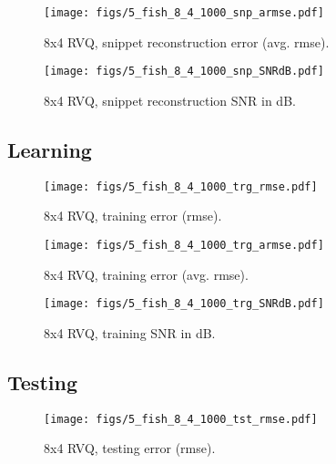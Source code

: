 								\begin{figure}[h!]
								\centering
								\texttt{[image: figs/5\_fish\_8\_4\_1000\_snp\_armse.pdf]}
								\caption{8x4 RVQ, snippet reconstruction error (avg. rmse).}
								\label{fig:5_fish_8_4_1000_snp_armse}
								\end{figure}

								\begin{figure}[h!]
								\centering
								\texttt{[image: figs/5\_fish\_8\_4\_1000\_snp\_SNRdB.pdf]}
								\caption{8x4 RVQ, snippet reconstruction SNR in dB.}
								\label{fig:5_fish_8_4_1000_snp_SNRdB}
								\end{figure}
\clearpage
\newpage
\subsection{Learning}

								\begin{figure}[h!]
								\centering
								\texttt{[image: figs/5\_fish\_8\_4\_1000\_trg\_rmse.pdf]}
								\caption{8x4 RVQ, training error (rmse).}
								\label{fig:5_fish_8_4_1000_trg_rmse}
								\end{figure}


								\begin{figure}[h!]
								\centering
								\texttt{[image: figs/5\_fish\_8\_4\_1000\_trg\_armse.pdf]}
								\caption{8x4 RVQ, training error (avg. rmse).}
								\label{fig:5_fish_8_4_1000_trg_armse}
								\end{figure}

								\begin{figure}[h!]
								\centering
								\texttt{[image: figs/5\_fish\_8\_4\_1000\_trg\_SNRdB.pdf]}
								\caption{8x4 RVQ, training SNR in dB.}
								\label{fig:5_fish_8_4_1000_trg_SNRdB}
								\end{figure}
\clearpage
\newpage
\subsection{Testing}
								\begin{figure}[h!]
								\centering
								\texttt{[image: figs/5\_fish\_8\_4\_1000\_tst\_rmse.pdf]}
								\caption{8x4 RVQ, testing error (rmse).}
								\label{fig:5_fish_8_4_1000_tst_rmse}
								\end{figure}


